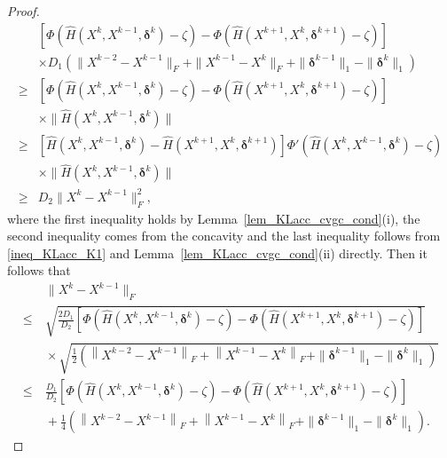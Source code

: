 \documentclass[twoside,11pt]{article}
\numberwithin{equation}{section}
\begin{document}
\begin{proof}
\begin{equation}
      \begin{aligned}
      &  \left[\Phi \left(\hat{H} (X^{k},X^{k-1},\bm{\delta}^{k})-\zeta\right) - \Phi \left(\hat{H} (X^{k+1},X^{k},\bm{\delta}^{k+1})-\zeta\right)\right] \\
      &\times  D_{1} \left(\|X^{k-2}-X^{k-1}\|_{F} +\|X^{k-1}-X^{k}\|_{F} + \|\bm{\delta}^{k-1}\|_{1}-\|\bm{\delta}^{k}\|_{1}\right) \\
      \ge& \left[\Phi \left(\hat{H} (X^{k},X^{k-1},\bm{\delta}^{k})-\zeta\right) - \Phi \left(\hat{H} (X^{k+1},X^{k},\bm{\delta}^{k+1})-\zeta\right)\right] \\
      &\times  \| \hat{H} (X^{k},X^{k-1},\bm{\delta}^{k})\| \\
      \ge&\left[\hat{H} (X^{k},X^{k-1},\bm{\delta}^{k})-\hat{H} (X^{k+1},X^{k},\bm{\delta}^{k+1})\right] \Phi{'} \left(\hat{H} (X^{k},X^{k-1},\bm{\delta}^{k})-\zeta\right) \\
      &\times  \| \hat{H} (X^{k},X^{k-1},\bm{\delta}^{k})\| \\
      \ge& D_{2} \|X^{k}-X^{k-1}\|_{F}^{2} ,
    \end{aligned}\end{equation}   
    where the first inequality holds by Lemma~\ref{lem_KLacc_cvgc_cond}(i), the second inequality comes from the concavity  and the last inequality follows from \eqref{ineq_KLacc_K1} and Lemma~\ref{lem_KLacc_cvgc_cond}(ii) directly. 
    Then it follows that 
    \begin{equation}
      \begin{aligned}
        &\ \|X^{k}-X^{k-1}\|_{F} \\
     \le&\ \sqrt{\frac{2D_{1}}{D_{2}}\left[\Phi \left(\hat{H} (X^{k},X^{k-1},\bm{\delta}^{k})-\zeta\right) - \Phi \left(\hat{H} (X^{k+1},X^{k},\bm{\delta}^{k+1})-\zeta\right)\right]} \\
        &\ \times \sqrt{\frac{1}{2} \left(\left\|X^{k-2}-X^{k-1}\right\|_{F} +\left\|X^{k-1}-X^{k}\right\|_{F} + \|\bm{\delta}^{k-1}\|_{1} - \|\bm{\delta}^{k}\|_{1}\right)} \\
     \le&\ \frac{D_{1}}{D_{2}}\left[\Phi \left(\hat{H} (X^{k},X^{k-1},\bm{\delta}^{k})-\zeta\right) - \Phi \left(\hat{H} (X^{k+1},X^{k},\bm{\delta}^{k+1})-\zeta\right)\right] \\
        &\ + \frac{1}{4} \left(\left\|X^{k-2}-X^{k-1}\right\|_{F} +\left\|X^{k-1}-X^{k}\right\|_{F} + \|\bm{\delta}^{k-1}\|_{1}-\|\bm{\delta}^{k}\|_{1}\right).
    \end{aligned}\end{equation}

\end{proof}
\end{document}
